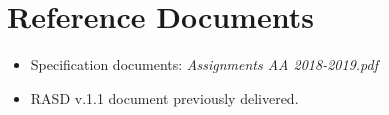 \section{Reference Documents}
\begin{itemize}

\item Specification documents: \emph{Assignments AA 2018-2019.pdf}

\item RASD v.1.1 document previously delivered.

\end{itemize}